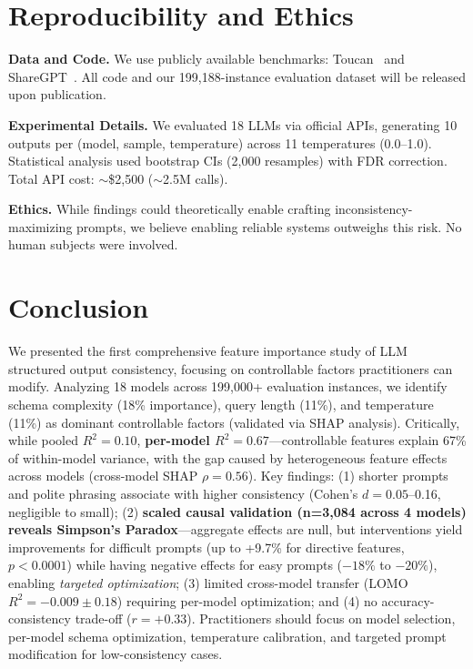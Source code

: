 \documentclass[sigconf,anonymous,review]{acmart}
\begin{document}
\section{Reproducibility and Ethics}
\label{sec:reproducibility}

\textbf{Data and Code.} We use publicly available benchmarks: Toucan~\cite{toucan2025} and ShareGPT~\cite{sharegpt2023}. All code and our 199,188-instance evaluation dataset will be released upon publication.

\textbf{Experimental Details.} We evaluated 18 LLMs via official APIs, generating 10 outputs per (model, sample, temperature) across 11 temperatures (0.0--1.0). Statistical analysis used bootstrap CIs (2,000 resamples) with FDR correction. Total API cost: $\sim$\$2,500 ($\sim$2.5M calls).

\textbf{Ethics.} While findings could theoretically enable crafting inconsistency-maximizing prompts, we believe enabling reliable systems outweighs this risk. No human subjects were involved.

\section{Conclusion}
\label{sec:conclusion}

We presented the first comprehensive feature importance study of LLM structured output consistency, focusing on controllable factors practitioners can modify. Analyzing 18 models across 199,000+ evaluation instances, we identify schema complexity (18\% importance), query length (11\%), and temperature (11\%) as dominant controllable factors (validated via SHAP analysis). Critically, while pooled $R^2=0.10$, \textbf{per-model $R^2=0.67$}---controllable features explain 67\% of within-model variance, with the gap caused by heterogeneous feature effects across models (cross-model SHAP $\rho=0.56$). Key findings: (1) shorter prompts and polite phrasing associate with higher consistency (Cohen's $d = 0.05$--0.16, negligible to small); (2) \textbf{scaled causal validation (n=3,084 across 4 models) reveals Simpson's Paradox}---aggregate effects are null, but interventions yield improvements for difficult prompts (up to +9.7\% for directive features, $p<0.0001$) while having negative effects for easy prompts ($-18\%$ to $-20\%$), enabling \textit{targeted optimization}; (3) limited cross-model transfer (LOMO $R^2=-0.009 \pm 0.18$) requiring per-model optimization; and (4) no accuracy-consistency trade-off ($r=+0.33$). Practitioners should focus on model selection, per-model schema optimization, temperature calibration, and targeted prompt modification for low-consistency cases.
\end{document}
